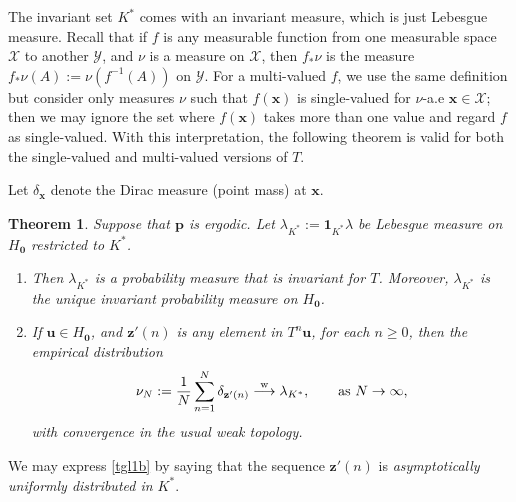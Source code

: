 \documentclass[11pt,reqno,tbtags,a4paper]{amsart}
\numberwithin{equation}{section}
\renewcommand\ge{\geq}
\renewcommand\geq{\geqslant}
\theoremstyle{plain}%
\newtheorem{theorem}{Theorem}[section]
\theoremstyle{definition}
\theoremstyle{remark}
\newenvironment{romenumerate}[1][-10pt]{%
\addtolength{\leftmargini}{#1}\begin{enumerate}%
 \renewcommand{\labelenumi}{\textup{(\roman{enumi})}}%
 \renewcommand{\theenumi}{\labelenumi}%
%
 }{\end{enumerate}}
\newcommand\Ntoo{\ensuremath{{N\to\infty}}}
\newcommand\punkt{\xperiod}    %
\newcommand{\aex}{a.e\punkt}
\newcommand{\tend}{\longrightarrow}
\newcommand\wto{\overset{\mathrm{w}}{\tend}}
\newcommand\gd{\delta}
\newcommand\gl{\lambda}
\newcommand\cX{{\mathcal X}}
\newcommand\cY{{\mathcal Y}}
\newcommand\etta{\boldsymbol1}
\newcommand\qw{^{-1}}
\newcommand\Ho{H_{\0}}
\newcommand\vp{\mathbf{p}}
\newcommand\vu{\mathbf{u}}
\newcommand\vx{\mathbf{x}}
\newcommand\vz{\mathbf{z}}
\newcommand\Kx{K^*}
\newcommand\glKx{\gl_{\Kx}}
\newcommand\stj{_*}
\newcommand\0{{\boldsymbol 0}}
\newcommand\1{{\boldsymbol 1}}
\begin{document}
The invariant set $\Kx$
comes with an invariant measure, which
is just Lebesgue measure.
Recall that if $f$ is any measurable function from one measurable space
$\cX$ to another $\cY$, and $\nu$ is a measure on $\cX$, then $f\stj\nu$ is
the measure $f\stj\nu(A):=\nu(f\qw(A))$ on $\cY$.
For a multi-valued $f$, we  use the same definition but consider only measures
$\nu$ such that $f(\vx)$ is single-valued for $\nu$-\aex{} $\vx\in\cX$;
then we may ignore the set where $f(\vx)$ takes more than one value and
regard $f$ as single-valued.
With this interpretation, the following theorem is valid for
both the single-valued and multi-valued versions  of $T$.

Let $\gd_\vx$ denote the Dirac measure (point mass) at $\vx$.

\begin{theorem}\label{Tgl}
Suppose that $\vp$ is ergodic.
Let $\glKx:=\etta_{\Kx}\gl$ be Lebesgue measure on $\Ho$ restricted to $\Kx$.
\begin{romenumerate}
  
\item \label{Tgla}
Then $\glKx$ is a probability measure that is invariant for $T$.
Moreover, $\glKx$ is the unique invariant probability measure on $\Ho$.

\item \label{Tglb}
If\/ $\vu\in\Ho$, and $\vz'(n)$ is any element in $T^n\vu$, 
%
for each $n\ge0$, then the empirical distribution
\begin{align}\label{tgl1b}
  \nu_N:=\frac{1}{N}\sum_{n=1}^N \gd_{\vz'(n)}
\wto\glKx,
\qquad \text{as \Ntoo}, 
\end{align}
with convergence in the usual weak topology.
\end{romenumerate}  
\end{theorem}

We may express \eqref{tgl1b} by saying that the sequence $\vz'(n)$ is
\emph{asymptotically uniformly distributed in $\Kx$}.
\end{document}
